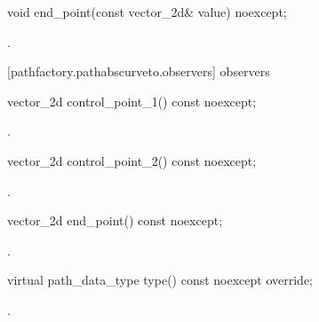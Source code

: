 \begin{itemdecl}
    void end_point(const vector_2d& value) noexcept;
\end{itemdecl}
\begin{itemdescr}
	\pnum
	\postconditions
	.
\end{itemdescr}

 [pathfactory.pathabscurveto.observers]{ observers}

\begin{itemdecl}
    vector_2d control_point_1() const noexcept;
\end{itemdecl}
\begin{itemdescr}
	\pnum
	\returns
	.
\end{itemdescr}

\begin{itemdecl}
    vector_2d control_point_2() const noexcept;
\end{itemdecl}
\begin{itemdescr}
	\pnum
	\returns
	.
\end{itemdescr}

\begin{itemdecl}
    vector_2d end_point() const noexcept;
\end{itemdecl}
\begin{itemdescr}
	\pnum
	\returns
	.
\end{itemdescr}

\begin{itemdecl}
    virtual path_data_type type() const noexcept override;
\end{itemdecl}
\begin{itemdescr}
	\pnum
	\returns
	.
\end{itemdescr}
